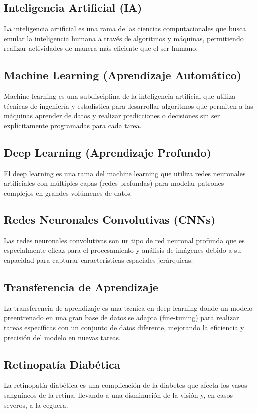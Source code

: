 

\subsection{Inteligencia Artificial (IA)}
La inteligencia artificial es una rama de las ciencias computacionales que busca emular la inteligencia humana a través de algoritmos y máquinas, permitiendo realizar actividades de manera más eficiente que el ser humano.

\subsection{Machine Learning (Aprendizaje Automático)}
Machine learning es una subdisciplina de la inteligencia artificial que utiliza técnicas de ingeniería y estadística para desarrollar algoritmos que permiten a las máquinas aprender de datos y realizar predicciones o decisiones sin ser explícitamente programadas para cada tarea.

\subsection{Deep Learning (Aprendizaje Profundo)}
El deep learning es una rama del machine learning que utiliza redes neuronales artificiales con múltiples capas (redes profundas) para modelar patrones complejos en grandes volúmenes de datos.

\subsection{Redes Neuronales Convolutivas (CNNs)}
Las redes neuronales convolutivas son un tipo de red neuronal profunda que es especialmente eficaz para el procesamiento y análisis de imágenes debido a su capacidad para capturar características espaciales jerárquicas.

\subsection{Transferencia de Aprendizaje}
La transferencia de aprendizaje es una técnica en deep learning donde un modelo preentrenado en una gran base de datos se adapta (fine-tuning) para realizar tareas específicas con un conjunto de datos diferente, mejorando la eficiencia y precisión del modelo en nuevas tareas.

\subsection{Retinopatía Diabética}
La retinopatía diabética es una complicación de la diabetes que afecta los vasos sanguíneos de la retina, llevando a una disminución de la visión y, en casos severos, a la ceguera.

